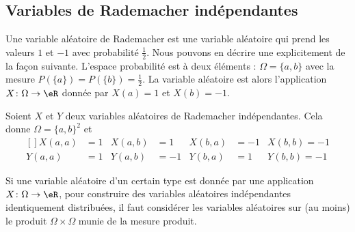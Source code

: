 \subsection{Variables de Rademacher indépendantes}
\label{SUBSECooWOOGooVxflVZ}

Une variable aléatoire de Rademacher est une variable aléatoire qui prend les valeurs \( 1\) et \( -1\) avec probabilité \( \frac{ 1 }{2}\). Nous pouvons en décrire une explicitement de la façon suivante. L'espace probabilité est à deux éléments : \( \Omega=\{ a,b \}\) avec la mesure \( P(\{ a \})=P(\{ b \})=\frac{ 1 }{2}\). La variable aléatoire est alors l'application \( X\colon \Omega\to \eR\) donnée par \( X(a)=1\) et \( X(b)=-1\).

Soient \( X\) et \( Y\) deux variables aléatoires de Rademacher indépendantes. Cela donne \( \Omega=\{ a,b \}^2\) et
\begin{equation}
	\begin{aligned}[]
		X(a,a) & =1 & X(a,b) & =1  & X(b,a) & =-1 & X(b,b)=-1 \\
		Y(a,a) & =1 & Y(a,b) & =-1 & Y(b,a) & =1  & Y(b,b)=-1
	\end{aligned}
\end{equation}

\begin{remark}
	Si une variable aléatoire d'un certain type est donnée par une application \( X\colon \Omega\to \eR\), pour construire des variables aléatoires indépendantes identiquement distribuées, il faut considérer les variables aléatoires sur (au moins) le produit \( \Omega\times \Omega\) munie de la mesure produit.
\end{remark}

